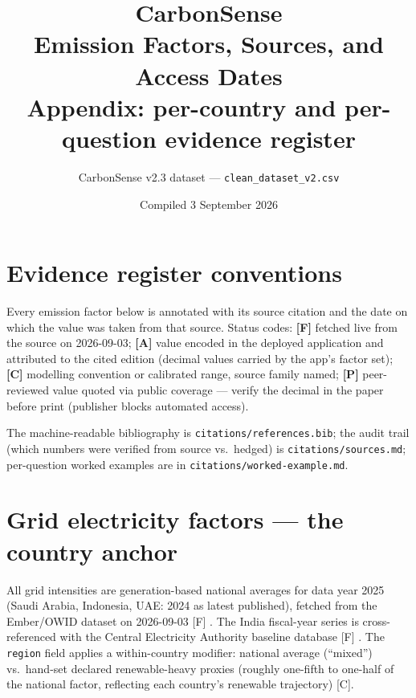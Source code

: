 \documentclass[11pt,a4paper]{article}
\title{\textbf{CarbonSense}\\ \Large Emission Factors, Sources, and Access Dates\\
\large Appendix: per-country and per-question evidence register}
\author{CarbonSense v2.3 dataset --- \texttt{clean\_dataset\_v2.csv}}
\date{Compiled 3 September 2026}
\begin{document}
\maketitle

\section*{Evidence register conventions}

Every emission factor below is annotated with its source citation and the
date on which the value was taken from that source. Status codes:
\textbf{[F]} fetched live from the source on 2026-09-03;
\textbf{[A]} value encoded in the deployed application and attributed to
the cited edition (decimal values carried by the app's factor set);
\textbf{[C]} modelling convention or calibrated range, source family named;
\textbf{[P]} peer-reviewed value quoted via public coverage --- verify the
decimal in the paper before print (publisher blocks automated access).

The machine-readable bibliography is \texttt{citations/references.bib};
the audit trail (which numbers were verified from source vs.\ hedged) is
\texttt{citations/sources.md}; per-question worked examples are in
\texttt{citations/worked-example.md}.

\section{Grid electricity factors --- the country anchor}

All grid intensities are generation-based national averages for data year
2025 (Saudi Arabia, Indonesia, UAE: 2024 as latest published), fetched
from the Ember/OWID dataset on 2026-09-03 [F] \cite{ember_grid}. The
India fiscal-year series is cross-referenced with the Central Electricity
Authority baseline database [F] \cite{cea_baseline, owid_india_electricity}.
The \texttt{region} field applies a within-country modifier: national
average (``mixed'') vs.\ hand-set declared renewable-heavy proxies
(roughly one-fifth to one-half of the national factor, reflecting each
country's renewable trajectory) [C].
\end{document}
